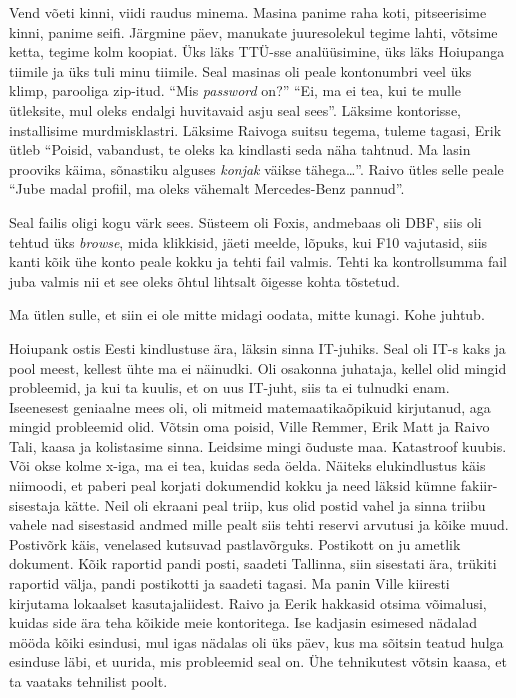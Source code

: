 Vend võeti kinni, viidi raudus minema. Masina panime raha koti, pitseerisime 
kinni, panime seifi. Järgmine päev, manukate juuresolekul tegime lahti, võtsime 
ketta, tegime kolm koopiat. Üks läks TTÜ-sse analüüsimine, üks läks Hoiupanga 
tiimile ja üks tuli minu tiimile. Seal masinas oli peale kontonumbri veel üks 
klimp, parooliga zip-itud. \enquote{Mis \emph{password} on?} \enquote{Ei, ma ei 
tea, kui te mulle ütleksite, mul oleks endalgi huvitavaid asju seal sees}. 
Läksime kontorisse, installisime murdmisklastri. Läksime 
Raivoga suitsu tegema, tuleme tagasi, 
Erik ütleb \enquote{Poisid, vabandust, te oleks ka 
kindlasti seda näha tahtnud. Ma lasin prooviks käima, sõnastiku alguses 
\emph{konjak} väikse tähega\ldots}. Raivo ütles selle peale \enquote{Jube madal 
profiil, ma oleks vähemalt Mercedes-Benz  pannud}. 

Seal failis oligi kogu värk sees. Süsteem oli Foxis, andmebaas oli DBF, siis 
oli tehtud üks \emph{browse}, mida klikkisid, jäeti meelde, lõpuks, kui F10 
vajutasid, siis kanti kõik ühe konto peale kokku ja tehti fail valmis. Tehti ka 
kontrollsumma fail juba valmis nii et see oleks õhtul lihtsalt õigesse kohta 
tõstetud. 


Ma ütlen sulle, et siin ei ole mitte midagi oodata, mitte kunagi. Kohe juhtub.

Hoiupank ostis Eesti kindlustuse ära, läksin sinna IT-juhiks. Seal oli IT-s 
kaks ja pool meest, kellest ühte ma ei näinudki. Oli osakonna juhataja, kellel 
olid mingid probleemid, ja kui ta kuulis, et on uus IT-juht, siis ta ei 
tulnudki enam. Iseenesest geniaalne mees oli, oli mitmeid matemaatikaõpikuid 
kirjutanud, aga mingid probleemid olid. Võtsin oma poisid, Ville 
Remmer, Erik Matt ja Raivo 
Tali, kaasa ja kolistasime sinna. Leidsime mingi 
õuduste maa. Katastroof kuubis. Või okse kolme x-iga, ma ei tea, kuidas seda 
öelda. Näiteks elukindlustus käis niimoodi, et paberi peal korjati dokumendid 
kokku ja need läksid kümne fakiir-sisestaja kätte. Neil oli ekraani peal triip, 
kus olid postid vahel ja sinna triibu vahele nad sisestasid andmed mille pealt 
siis tehti reservi arvutusi ja kõike muud. Postivõrk käis, venelased kutsuvad 
pastlavõrguks. Postikott on ju ametlik dokument. Kõik raportid pandi posti, 
saadeti Tallinna, siin sisestati ära, trükiti raportid välja, pandi postikotti 
ja saadeti tagasi. Ma panin Ville kiiresti kirjutama lokaalset kasutajaliidest. 
Raivo ja Eerik hakkasid otsima võimalusi, kuidas side ära teha kõikide meie 
kontoritega. Ise kadjasin  esimesed nädalad mööda kõiki esindusi, mul igas 
nädalas oli üks päev, kus ma sõitsin teatud hulga esinduse läbi, et uurida, mis 
probleemid seal on. Ühe tehnikutest võtsin kaasa, et ta vaataks tehnilist 
poolt. 

